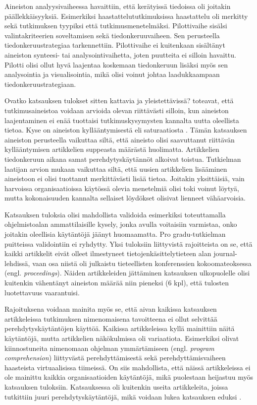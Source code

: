 \documentclass[utf8]{gradu3}
\begin{document}
Aineiston analyysivaiheessa havaittiin, että kerätyissä tiedoissa oli joitakin päällekkäisyyksiä. Esimerkiksi haastattelututkimuksissa haastattelu oli merkitty sekä tutkimuksen tyypiksi että tutkimusmenetelmäksi. Pilottivaihe sisälsi valintakriteerien soveltamisen sekä tiedonkeruuvaiheen. Sen perusteella tiedonkeruustrategiaa tarkennettiin. Pilottivaihe ei kuitenkaan sisältänyt aineiston synteesi- tai analysointivaihetta, joten puutteita ei silloin havaittu. Pilotti olisi ollut hyvä laajentaa koskemaan tiedonkeruun lisäksi myös sen analysointia ja visualisointia, mikä olisi voinut johtaa laadukkaampaan tiedonkeruustrategiaan.

Ovatko katsauksen tulokset sitten kattavia ja yleistettävissä? \textcite{eskola-suoranta-1998} toteavat, että tutkimusaineistoa voidaan arvioida olevan riittävästi silloin, kun aineiston laajentaminen ei enää tuottaisi tutkimuskysymysten kannalta uutta oleellista tietoa. Kyse on aineiston kyllääntymisestä eli saturaatiosta \parencite{eskola-suoranta-1998}. Tämän katsauksen aineiston perusteella vaikuttaa siltä, että aineisto olisi saavuttanut riittävän kyllääntymisen artikkelien suppeasta määrästä huolimatta. Artikkelien tiedonkeruun aikana samat perehdytyskäytännöt alkoivat toistua. Tutkielman laatijan arvion mukaan vaikuttaa siltä, että uusien artikkelien lisääminen aineistoon ei olisi tuottanut merkittävästi lisää tietoa. Joitakin yksittäisiä, vain harvoissa organisaatioissa käytössä olevia menetelmiä olisi toki voinut löytyä, mutta kokonaisuuden kannalta sellaiset löydökset olisivat lienneet vähäarvoisia.

Katsauksen tuloksia olisi mahdollista validoida esimerkiksi toteuttamalla ohjelmistoalan ammattilaisille kysely, jonka avulla voitaisiin varmistaa, onko joitakin oleellisia käytäntöjä jäänyt huomaamatta. Pro gradu-tutkielman puitteissa validointiin ei ryhdytty. Yksi tuloksiin liittyvistä rajoitteista on se, että kaikki artikkelit eivät olleet ilmestyneet tietojenkäsittelytieteen alan journal-lehdissä, vaan osa niistä oli julkaistu tieteellisten konferenssien kokoomateoksessa (engl. \textit{proceedings}). Näiden artikkeleiden jättäminen katsauksen ulkopuolelle olisi kuitenkin vähentänyt aineiston määrää niin pieneksi (6 kpl), että tulosten luotettavuus vaarantuisi.

Rajoituksena voidaan mainita myös se, että aivan kaikissa katsauksen artikkeleissa tutkimuksen nimenomaisena tavoitteena ei ollut selvittää perehdytyskäytäntöjen käyttöä. Kaikissa artikkeleissa kyllä mainittiin näitä käytäntöjä, mutta artikkelien näkökulmissa oli variaatiota. Esimerkiksi \textcite{yates-ym-2020} olivat kiinnostuneita nimenomaan ohjelman ymmärtämiseen (engl. \textit{program comprehension}) liittyvästä perehdyttämisestä sekä \textcite{hemphill-begel-2011} perehdyttämisvaiheen haasteista virtuaalisissa tiimeissä. On siis mahdollista, että näissä artikkeleissa ei ole mainittu kaikkia organisaatioiden käytäntöjä, mikä puolestaan heijastuu myös katsauksen tuloksiin. Katsauksessa oli kuitenkin useita artikkeleita, joissa tutkittiin juuri perehdytyskäytäntöjä, mikä voidaan lukea katsauksen eduksi
%
\parencites%
    {ju-ym-2021}%
    {britto-ym-2020}%
    {moe-ym-2020}%
    {viviani-murphy-2019}%
    {buchan-ym-2019}%
    {johnson-senges-2010}%
\relax.
%
\end{document}
